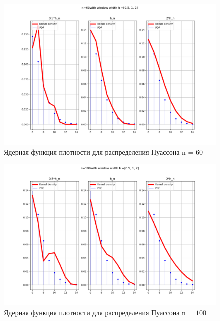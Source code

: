 \documentclass[a4]{article}
\begin{document}
\begin{center}
	\begin{figure}[H]
		\caption{Ядерная функция плотности для распределения Пуассона n = $60$}
		\includegraphics[width=\textwidth]{Lab4_poisson_pdf_60.png} 
	\end{figure}
	
	\begin{figure}[H]
		\caption{Ядерная функция плотности для распределения Пуассона n = $100$}
		\includegraphics[width=\textwidth]{Lab4_poisson_pdf_100.png} 
	\end{figure}
	

\end{center}
\end{document}
